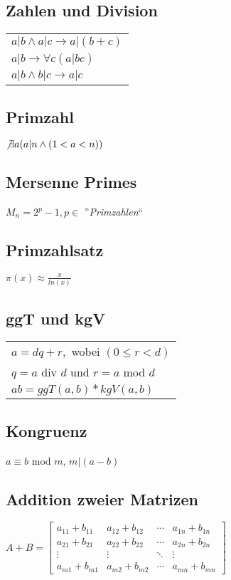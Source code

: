 \subsection{Zahlen und Division}
\begin{tabular}{l}
    $ a|b \land a|c \rightarrow a|(b + c) $ \\
    $ a|b \rightarrow \forall c(a|bc) $ \\
    $ a|b \land b|c \rightarrow a|c $ \\
\end{tabular}

\subsection{Primzahl}
$ \not \exists a (a|n \land (1 < a < n)) $

\subsection{Mersenne Primes}
$ M_n = 2^p - 1, p \in $ ''\textit{Primzahlen}``

\subsection{Primzahlsatz}
$ \pi (x) \approx \frac{x}{ln(x)} $

\subsection{ggT und kgV}
\begin{tabular}{l}
    $ a = dq + r, $ wobei $ (0 \leq r < d)$ \\
    $ q = a $ div $ d $ und $ r = a $ mod $ d $ \\
    $ ab = ggT(a, b) * kgV(a, b) $ \\
\end{tabular}

\subsection{Kongruenz}
$ a \equiv b $ mod $ m $, $ m|(a - b) $ 

\subsection{Addition zweier Matrizen}
$ A + B = 
\begin{bmatrix}
    a_{11} + b_{11} & a_{12} + b_{12} & \cdots & a_{1n} + b_{1n} \\
    a_{21} + b_{21} & a_{22} + b_{22} & \cdots & a_{2n} + b_{2n} \\
    \vdots  & \vdots  & \ddots & \vdots  \\
    a_{m1} + b_{m1} & a_{m2} + b_{m2} & \cdots & a_{mn} + b_{mn} 
\end{bmatrix}$

